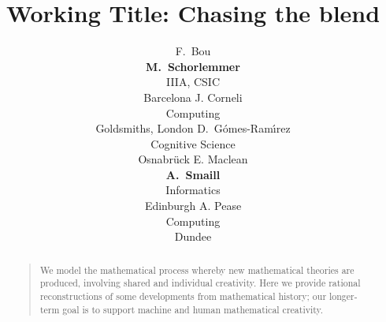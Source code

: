 \documentclass[letterpaper]{article}
\title{Working Title: Chasing the blend}
\author{F.\ Bou \\ \Large{\textbf{M.\ Schorlemmer}}\\IIIA, CSIC \\ Barcelona
        \And J. Corneli \\Computing \\Goldsmiths, London
        \And D.\ G{\'o}mes-Ram{\'{\i}}rez\\Cognitive Science \\Osnabr{\"u}ck
        \And E. Maclean \\\Large{\textbf{A.\ Smaill}}\\ Informatics\\ Edinburgh
        \And A. Pease \\ Computing \\ Dundee}
\begin{document}
 
\maketitle
\begin{abstract}
\begin{quote}
We model the mathematical process whereby new mathematical
theories are produced, involving shared and individual creativity.
Here we provide rational reconstructions of some developments
from mathematical history;  our longer-term goal is to support
machine and human mathematical creativity.
\end{quote}
\end{abstract}









\nocite{Weil60}
\nocite{Boden90}
\nocite{nunez05}
\nocite{Lak00}
\nocite{Gog05,Gog99}

\printbibliography
\end{document}
